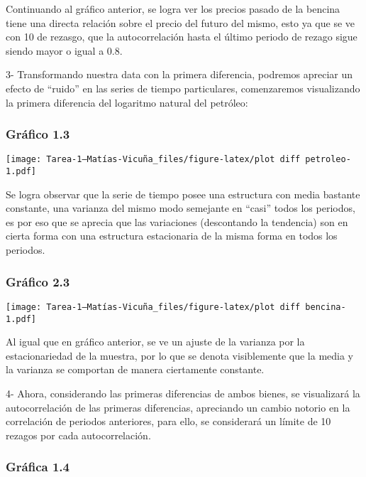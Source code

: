 \documentclass[
]{article}
\begin{document}
Continuando al gráfico anterior, se logra ver los precios pasado de la
bencina tiene una directa relación sobre el precio del futuro del mismo,
esto ya que se ve con 10 de rezasgo, que la autocorrelación hasta el
último periodo de rezago sigue siendo mayor o igual a 0.8.

3- Transformando nuestra data con la primera diferencia, podremos
apreciar un efecto de ``ruido'' en las series de tiempo particulares,
comenzaremos visualizando la primera diferencia del logaritmo natural
del petróleo:

\hypertarget{gruxe1fico-1.3}{%
\subsubsection{Gráfico 1.3}\label{gruxe1fico-1.3}}

\texttt{[image: Tarea-1---Matías-Vicuña\_files/figure-latex/plot diff petroleo-1.pdf]}

Se logra observar que la serie de tiempo posee una estructura con media
bastante constante, una varianza del mismo modo semejante en ``casi''
todos los periodos, es por eso que se aprecia que las variaciones
(descontando la tendencia) son en cierta forma con una estructura
estacionaria de la misma forma en todos los periodos.

\hypertarget{gruxe1fico-2.3}{%
\subsubsection{Gráfico 2.3}\label{gruxe1fico-2.3}}

\texttt{[image: Tarea-1---Matías-Vicuña\_files/figure-latex/plot diff bencina-1.pdf]}

Al igual que en gráfico anterior, se ve un ajuste de la varianza por la
estacionariedad de la muestra, por lo que se denota visiblemente que la
media y la varianza se comportan de manera ciertamente constante.

\newpage

4- Ahora, considerando las primeras diferencias de ambos bienes, se
visualizará la autocorrelación de las primeras diferencias, apreciando
un cambio notorio en la correlación de periodos anteriores, para ello,
se considerará un límite de 10 rezagos por cada autocorrelación.

\hypertarget{gruxe1fica-1.4}{%
\subsubsection{Gráfica 1.4}\label{gruxe1fica-1.4}}
\end{document}
